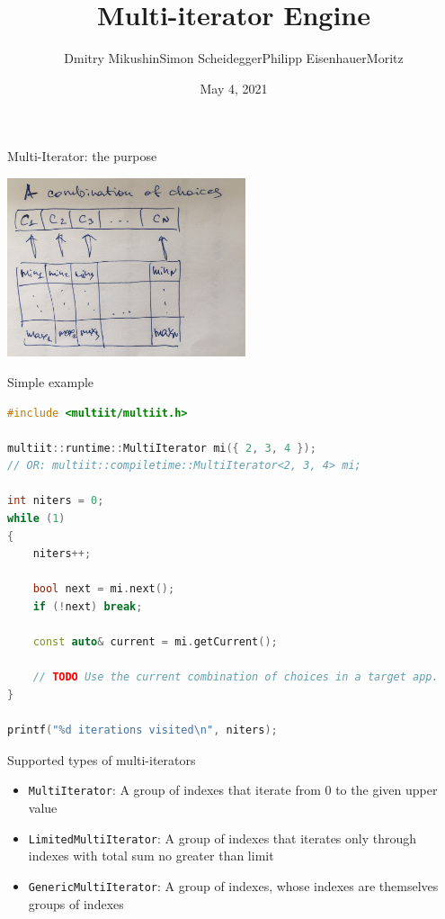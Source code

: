 \documentclass[aspectratio=169,twoside]{beamer}
\title[Multi-iterator Engine]{Multi-iterator Engine}
\author[Dmitry Mikushin et al.]{Dmitry Mikushin\quad Simon Scheidegger\quad Philipp Eisenhauer\quad Moritz}
\institute[UNIL]{}
\date{May 4, 2021}
\begin{document}
{
\begin{frame}
  \titlepage
\end{frame}
}
\addtocounter{framenumber}{-1}






\begin{frame}[fragile]{Multi-Iterator: the purpose}

\includegraphics[width=7cm]{figures/IMG_0509}

\end{frame}



\begin{frame}[fragile]{Simple example}

\begin{lstlisting}[basicstyle=\tiny\ttfamily, language=c++]
#include <multiit/multiit.h>

multiit::runtime::MultiIterator mi({ 2, 3, 4 });
// OR: multiit::compiletime::MultiIterator<2, 3, 4> mi;

int niters = 0; 
while (1)       
{               
    niters++;           
                        
    bool next = mi.next();
    if (!next) break;   
                        
    const auto& current = mi.getCurrent();
                        
    // TODO Use the current combination of choices in a target app.
}               

printf("%d iterations visited\n", niters);
\end{lstlisting}

\end{frame}



\begin{frame}[fragile]{Supported types of multi-iterators}

\begin{itemize}
\item \texttt{MultiIterator}: A group of indexes that iterate from 0 to the given upper value
\item \texttt{LimitedMultiIterator}: A group of indexes that iterates only through indexes with total sum no greater than limit
\item \texttt{GenericMultiIterator}: A group of indexes, whose indexes are themselves groups of indexes
\end{itemize}

\end{frame}
\end{document}
